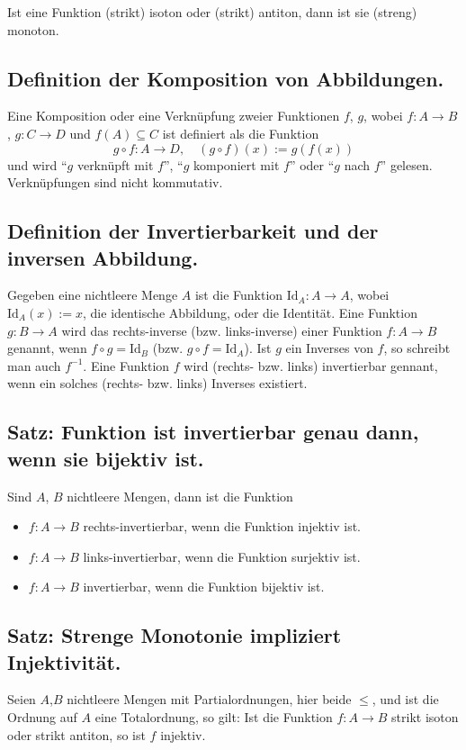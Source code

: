 Ist eine Funktion (strikt) isoton oder (strikt) antiton, dann ist sie (streng) monoton.

\subsection{Definition der Komposition von Abbildungen.}
Eine Komposition oder eine Verknüpfung zweier Funktionen $f$, $g$, wobei $f: A \longrightarrow B$, $g: C \longrightarrow D$ und $f(A) \subseteq C$ ist definiert als die Funktion $$g \circ f : A \longrightarrow D, \quad (g \circ f)(x) := g(f(x))$$ und wird “$g$ verknüpft mit $f$”, “$g$ komponiert mit $f$” oder “$g$ nach $f$” gelesen. Verknüpfungen sind nicht kommutativ.

\subsection{Definition der Invertierbarkeit und der inversen Abbildung.}
Gegeben eine nichtleere Menge $A$ ist die Funktion $\text{Id}_A: A \longrightarrow A$, wobei $\text{Id}_A (x):=x$, die identische Abbildung, oder die Identität. Eine Funktion $g: B \longrightarrow A$ wird das rechts-inverse (bzw. links-inverse) einer Funktion $f: A \longrightarrow B$ genannt, wenn $f \circ g = \text{Id}_B$ (bzw. $g \circ f = \text{Id}_A$). Ist $g$ ein Inverses von $f$, so schreibt man auch $f^{-1}$. Eine Funktion $f$ wird (rechts- bzw. links) invertierbar gennant, wenn ein solches (rechts- bzw. links) Inverses existiert.

\subsection{Satz: Funktion ist invertierbar genau dann, wenn sie bijektiv ist.}
Sind $A$, $B$ nichtleere Mengen, dann ist die Funktion
\begin{itemize}
\item $f: A \longrightarrow B$ rechts-invertierbar, wenn die Funktion injektiv ist.
\item $f: A \longrightarrow B$ links-invertierbar, wenn die Funktion surjektiv ist.
\item $f: A \longrightarrow B$ invertierbar, wenn die Funktion bijektiv ist.
\end{itemize}

\subsection{Satz: Strenge Monotonie impliziert Injektivität.}
Seien $A$,$B$ nichtleere Mengen mit Partialordnungen, hier beide $\leq$, und ist die Ordnung auf $A$ eine Totalordnung, so gilt: Ist die Funktion $f: A \longrightarrow B$ strikt isoton oder strikt antiton, so ist $f$ injektiv.

